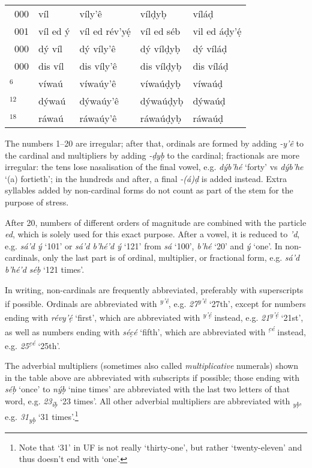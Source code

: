 \documentclass[a4paper, 12pt, twoside, final]{article}
\let \nf \normalfont
\let \w \textit
\let \Sub \textsubscript
\let \Sup \textsuperscript
\begin{document}
{\begin{longtable}{>{\nf}l|l|l|l|l}
    1~000  & víl             & víly’ê             & vílḍyḅ            & víláḍ           \\
    1~001  & víl ed ý        & víl ed rév’yẹ́      & víl ed séb        & vil ed áḍy’ẹ́    \\
    2~000  & dý víl          & dý víly’ê          & dý vílḍyḅ         & dý víláḍ        \\
    10~000 & dis víl         & dis víly’ê         & dis vílḍyḅ        & dis víláḍ       \\
    10$^6$ & víwaú           & víwaúy’ê           & víwaúḍyḅ          & víwaúḍ          \\
    10$^{12}$& dýwaú         & dýwaúy’ê           & dýwaúḍyḅ          & dýwaúḍ          \\
    10$^{18}$& ráwaú         & ráwaúy’ê           & ráwaúḍyḅ          & ráwaúḍ          \\
\end{longtable}
}

\noindent
The numbers 1–20 are irregular;
after that, ordinals are formed by adding \w{-y’ê} to the cardinal and multipliers by adding \w{-ḍyḅ} to the cardinal;
fractionals are more irregular: the tens lose nasalisation of the final vowel, e.g. \w{dýb’hé} ‘forty’ vs \w{dýb’he}
‘(a) fortieth’; in the hundreds and after, a final \w{-(á)ḍ} is added instead. Extra syllables added by non-cardinal
forms do not count as part of the stem for the purpose of stress.

After 20, numbers of different orders of magnitude are combined with the particle \w{ed}, which is solely used for this
exact purpose. After a vowel, it is reduced to \w{’d}, e.g. \w{sá’d ý} ‘101’ or \w{sá’d b’hé’d ý} ‘121’ from \w{sá} ‘100’,
\w{b’hé} ‘20’ and \w{ý} ‘one’. In non-cardinals, only the last part is of ordinal, multiplier,
or fractional form, e.g. \w{sá’d b’hé’d séḅ} ‘121 times’.

In writing, non-cardinals are frequently abbreviated, preferably with superscripts if possible. Ordinals are abbreviated
with \w{\Sup{y’ê}}, e.g. \w{27\Sup{y’ê}} ‘27th’, except for numbers ending
with \w{révy’ẹ́} ‘first’, which are abbreviated with \w{\Sup{y’ẹ́}} instead, e.g. \w{21\Sup{y’ẹ́}} ‘21st’, as
well as numbers ending with \w{séc̣é} ‘fifth’, which are abbreviated with \w{\Sup{c̣é}} instead, e.g. \w{25\Sup{c̣é}}
‘25th’.

The adverbial multipliers (sometimes also called \textit{multiplicative} numerals) shown in the table above are abbreviated with
subscripts if possible; those ending with \w{séḅ} ‘once’ to \w{nýḅ} ‘nine times’ are abbreviated with the last two letters of that
word, e.g. \w{23\Sub{íḅ}} ‘23 times’. All other adverbial multipliers are abbreviated with \w{\Sub{yḅ}}, e.g. \w{31\Sub{yḅ}}
‘31 times’.\footnote{Note that ‘31’ in UF is not really ‘thirty-one’, but rather ‘twenty-eleven’ and thus doesn’t
end with ‘one’.}
\end{document}
